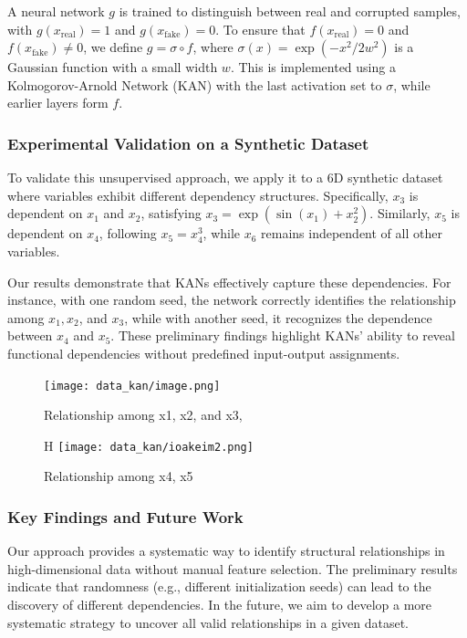 \documentclass[conference]{IEEEtran}
\begin{document}
A neural network $g$ is trained to distinguish between real and corrupted
samples, with $g(x_{\text{real}}) = 1$ and $g(x_{\text{fake}}) = 0$. To ensure
that $f(x_{\text{real}}) = 0$ and $f(x_{\text{fake}}) \neq 0$, we define $g =
    \sigma \circ f$, where $\sigma(x) = \exp(-x^2/2w^2)$ is a Gaussian function
with a small width $w$. This is implemented using a Kolmogorov-Arnold Network
(KAN) with the last activation set to $\sigma$, while earlier layers form $f$.

\subsubsection{Experimental Validation on a Synthetic Dataset}

To validate this unsupervised approach, we apply it to a 6D synthetic dataset
where variables exhibit different dependency structures. Specifically, $x_3$ is
dependent on $x_1$ and $x_2$, satisfying $x_3 = \exp(\sin(x_1) + x_2^2)$.
Similarly, $x_5$ is dependent on $x_4$, following $x_5 = x_4^3$, while $x_6$
remains independent of all other variables.

Our results demonstrate that KANs effectively capture these dependencies. For
instance, with one random seed, the network correctly identifies the
relationship among $x_1, x_2$, and $x_3$, while with another seed, it
recognizes the dependence between $x_4$ and $x_5$. These preliminary findings
highlight KANs' ability to reveal functional dependencies without predefined
input-output assignments.

\begin{figure}[H]
    \centering
    \texttt{[image: data\_kan/image.png]}
    \caption{Relationship among x1, x2, and x3,}
    \label{fig:rl_1}
\end{figure}

\begin{figure}{H}
    \centering
    \texttt{[image: data\_kan/ioakeim2.png]}
    \caption{Relationship among x4, x5}
    \label{fig:rl_2}
\end{figure}

\subsubsection{Key Findings and Future Work}

Our approach provides a systematic way to identify structural relationships in
high-dimensional data without manual feature selection. The preliminary results
indicate that randomness (e.g., different initialization seeds) can lead to the
discovery of different dependencies. In the future, we aim to develop a more
systematic strategy to uncover all valid relationships in a given dataset.
\end{document}
